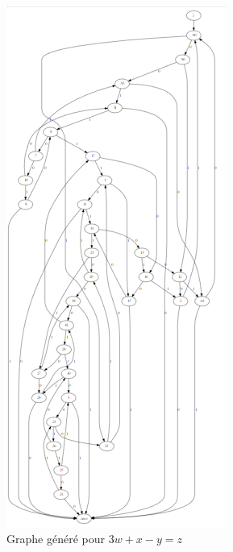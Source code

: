 \begin{figure}[h]

\centering

\includegraphics[scale=0.5]{graphe.png}

\caption{Graphe généré pour $3w+x-y=z$}
\label{image1}
\end{figure}
